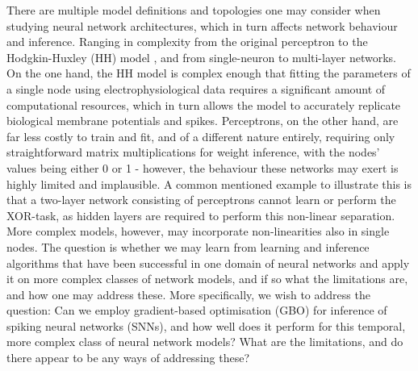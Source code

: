 \documentclass[mphil,deptreport,ianc]{infthesis} %
\begin{document}
There are multiple model definitions and topologies one may consider when studying neural network architectures, which in turn affects network behaviour and inference.
Ranging in complexity from the original perceptron \cite{McCulloch1943, Rosenblatt1956} to the Hodgkin-Huxley (HH) model \cite{HH1952}, and from single-neuron to multi-layer networks.
On the one hand, the HH model is complex enough that fitting the parameters of a single node using electrophysiological data requires a significant amount of computational resources, which in turn allows the model to accurately replicate biological membrane potentials and spikes.
Perceptrons, on the other hand, are far less costly to train and fit, and of a different nature entirely, requiring only straightforward matrix multiplications for weight inference, with the nodes' values being either 0 or 1 - however, the behaviour these networks may exert is highly limited and implausible.
A common mentioned example to illustrate this is that a two-layer network consisting of perceptrons cannot learn or perform the XOR-task, as hidden layers are required to perform this non-linear separation.
More complex models, however, may incorporate non-linearities also in single nodes.
The question is whether we may learn from learning and inference algorithms that have been successful in one domain of neural networks and apply it on more complex classes of network models, and if so what the limitations are, and how one may address these.
More specifically, we wish to address the question: Can we employ gradient-based optimisation (GBO) for inference of spiking neural networks (SNNs), and how well does it perform for this temporal, more complex class of neural network models? What are the limitations, and do there appear to be any ways of addressing these?
\end{document}
